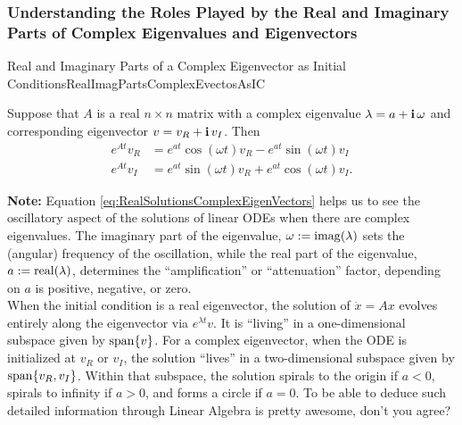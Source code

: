 \subsubsection{Understanding the Roles Played by the Real and Imaginary Parts of Complex Eigenvalues and Eigenvectors}

\bigskip
\begin{propColor}{Real and Imaginary Parts of a Complex Eigenvector as Initial Conditions}{RealImagPartsComplexEvectosAsIC}

Suppose that $A$ is a real $n\times n$ matrix with a complex eigenvalue $\lambda = a + \mathop{\bm{\mathrm i}} \omega$ and corresponding eigenvector $v = v_R + \mathop{\bm{\mathrm i}} v_I$. Then
\begin{equation}
\label{eq:RealSolutionsComplexEigenVectors}
    \begin{aligned}
        e^{At} v_R & = e^{at} \cos(\omega t) v_R -  e^{at} \sin(\omega t) v_I \\
        e^{At} v_I & = e^{at} \sin(\omega t) v_R +  e^{at} \cos(\omega t) v_I. 
    \end{aligned}
\end{equation}

\bigskip

\textbf{Note:} Equation \eqref{eq:RealSolutionsComplexEigenVectors} helps us to see the oscillatory aspect of the solutions of linear ODEs when there are complex eigenvalues. The imaginary part of the eigenvalue, $\omega:={\rm imag}(\lambda)$ sets the (angular) frequency of the oscillation, while the real part of the eigenvalue, $a:={\rm real}(\lambda)$, determines the ``amplification''  or ``attenuation'' factor, depending on $a$ is positive, negative, or zero. \\

When the initial condition is a real eigenvector, the solution of $\dot{x} = Ax$ evolves entirely along the eigenvector via $e^{\lambda t} v$. It is ``living'' in a one-dimensional subspace given by $\mathrm{span} \{ v \}$. For a complex eigenvector, when the ODE is initialized at $v_R$ or $v_I$, the solution ``lives'' in a two-dimensional subspace given by $\mathrm{span} \{ v_R, v_I \}$. Within that subspace, the solution spirals to the origin if $a <0$, spirals to infinity if $a>0$, and forms a circle if $a=0$. To be able to deduce such detailed information through Linear Algebra is pretty awesome, don't you agree?
    
\end{propColor}
\bigskip

